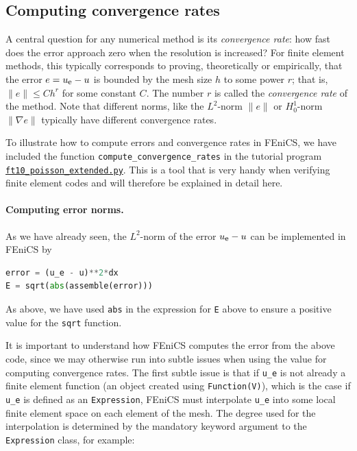 \documentclass[graybox,envcountchap,sectrefs,final]{svmonodo}
\begin{document}
\subsection{Computing convergence rates}
\label{ch:poisson0:convrates}


A central question for any numerical method is its \emph{convergence rate}:
how fast does the error approach zero when the resolution is
increased? For finite element methods, this typically corresponds to
proving, theoretically or empirically, that the error $e = u_{\mbox{\footnotesize e}} - u$
is bounded by the mesh size $h$ to some power $r$; that is, $\|e\|
\leq C h^r$ for some constant $C$. The number $r$ is called the
\emph{convergence rate} of the method. Note that different norms, like the
$L^2$-norm $\|e\|$ or $H^1_0$-norm $\|\nabla e\|$ typically have
different convergence rates.

To illustrate how to compute errors and convergence rates in FEniCS,
we have included the function \Verb!compute_convergence_rates! in the
tutorial program
\href{{https://fenicsproject.org/pub/tutorial/python/vol1/ft10_poisson_extended.py}}{\nolinkurl{ft10_poisson_extended.py}}.
This is a tool that is very handy when verifying finite element codes
and will therefore be explained in detail here.

\paragraph{Computing error norms.}

As we have already seen, the $L^2$-norm of the error $u_{\mbox{\footnotesize e}} - u$ can
be implemented in FEniCS by

\begin{lstlisting}[language=Python,style=graycolor]
error = (u_e - u)**2*dx
E = sqrt(abs(assemble(error)))
\end{lstlisting}
As above, we have used \texttt{abs} in the expression for \texttt{E} above to ensure
a positive value for the \texttt{sqrt} function.

It is important to understand how FEniCS computes the error from the
above code, since we may otherwise run into subtle issues when using
the value for computing convergence rates. The first subtle issue is
that if \Verb!u_e! is not already a finite element function (an object created
using \texttt{Function(V)}), which is the case if \Verb!u_e! is defined as an
\texttt{Expression}, FEniCS must interpolate \Verb!u_e! into some local finite
element space on each element of the mesh. The degree used for the
interpolation is determined by the mandatory keyword argument to the
\texttt{Expression} class, for example:
\end{document}

